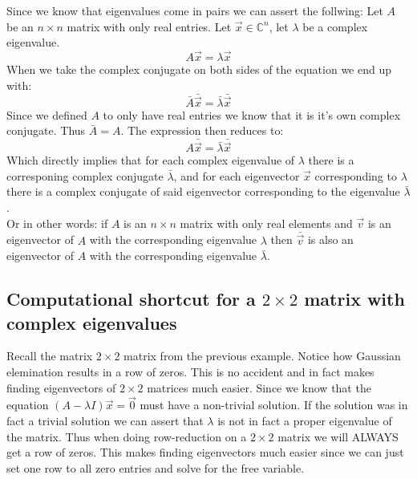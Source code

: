 \documentclass[11pt, a4paper]{article}
\newcommand*{\C}{\ensuremath{\mathbb{C}}}
\begin{document}
Since we know that eigenvalues come in pairs we can assert the follwing: Let $A$ be an $n \times n$ matrix with only real entries. Let $\vec{x} \in \C^n$, let $\lambda$ be a complex eigenvalue.
\begin{equation*}
  A\vec{x} = \lambda \vec{x}
\end{equation*}
When we take the complex conjugate on both sides of the equation we end up with:
\begin{equation*}
  \bar{A}\bar{\vec{x}} = \bar{\lambda}{\bar{\vec{x}}}
\end{equation*}
Since we defined $A$ to only have real entries we know that it is it's own complex conjugate. Thus $\bar{A} = A$. The expression then reduces to:
\begin{equation}
  A \bar{\vec{x}} = \bar{\lambda}\bar{\vec{x}}
\end{equation}
Which directly implies that for each complex eigenvalue of $\lambda$ there is a corresponing complex conjugate $\bar{\lambda}$, and for each eigenvector $\vec{x}$ corresponding to $\lambda$ there is a complex conjugate of said eigenvector corresponding to the eigenvalue $\bar{\lambda}$.\\
Or in other words: if $A$ is an $n \times n$ matrix with only real elements and $\vec{v}$ is an eigenvector of $A$ with the corresponding eigenvalue $\lambda$ then $\bar{\vec{v}}$ is also an eigenvector of $A$ with the corresponding eigenvalue $\bar{\lambda}$.


\subsection{Computational shortcut for a $2 \times 2$ matrix with complex eigenvalues}
Recall the matrix $2 \times 2$ matrix from the previous example. Notice how Gaussian elemination results in a row of zeros. This is no accident and in fact makes finding eigenvectors of $2 \times 2$ matrices much easier. Since we know that the equation $(A - \lambda I)\vec{x} = \vec{0}$ must have a non-trivial solution. If the solution was in fact a trivial solution we can assert that $\lambda$ is not in fact a proper eigenvalue of the matrix. Thus when doing row-reduction on a $2 \times 2$ matrix we will ALWAYS get a row of zeros. This makes finding eigenvectors much easier since we can just set one row to all zero entries and solve for the free variable.
\end{document}
